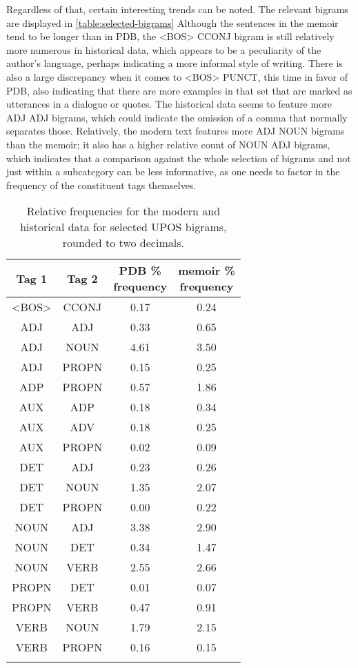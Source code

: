 Regardless of that, certain interesting trends can be noted. The relevant bigrams are displayed in \autoref{table:selected-bigrams} Although the sentences in the memoir tend to be longer than in PDB, the <BOS> CCONJ bigram is still relatively more numerous in historical data, which appears to be a peculiarity of the author's language, perhaps indicating a more informal style of writing. There is also a large discrepancy when it comes to <BOS> PUNCT, this time in favor of PDB, also indicating that there are more examples in that set that are marked as utterances in a dialogue or quotes. The historical data seems to feature more ADJ ADJ bigrams, which could indicate the omission of a comma that normally separates those. Relatively, the modern text features more ADJ NOUN bigrams than the memoir; it also has a higher relative count of NOUN ADJ bigrams, which indicates that a comparison against the whole selection of bigrams and not just within a subcategory can be less informative, as one needs to factor in the frequency of the constituent tags themselves. 

\renewcommand{\arraystretch}{1.1}
\begin{longtable}[H]{|cc|c|c|}
\hline \bf Tag 1 & \bf Tag 2 & \bf \makecell[c]{PDB \% \\ frequency} & \bf \makecell[c]{memoir \% \\ frequency} \\ \hline
<BOS> & CCONJ & 0.17 & 0.24 \\ \hline
ADJ & ADJ & 0.33 & 0.65 \\
ADJ & NOUN & 4.61 & 3.50 \\
ADJ & PROPN & 0.15 & 0.25 \\ \hline
ADP & PROPN & 0.57 & 1.86 \\ \hline
AUX & ADP & 0.18 & 0.34 \\
AUX & ADV & 0.18 & 0.25 \\
AUX & PROPN & 0.02 & 0.09 \\ \hline
DET & ADJ & 0.23 & 0.26 \\
DET & NOUN & 1.35 & 2.07 \\
DET & PROPN & 0.00 & 0.22 \\ \hline
NOUN & ADJ & 3.38 & 2.90 \\
NOUN & DET & 0.34 & 1.47 \\
NOUN & VERB & 2.55 & 2.66 \\ \hline 
PROPN & DET & 0.01 & 0.07 \\
PROPN & VERB & 0.47 & 0.91 \\ \hline
VERB & NOUN & 1.79 & 2.15 \\ 
VERB & PROPN & 0.16 & 0.15 \\
\hline
\caption{\label{table:selected-bigrams} Relative frequencies for the modern and historical data for selected UPOS bigrams, rounded to two decimals.}
\end{longtable}

